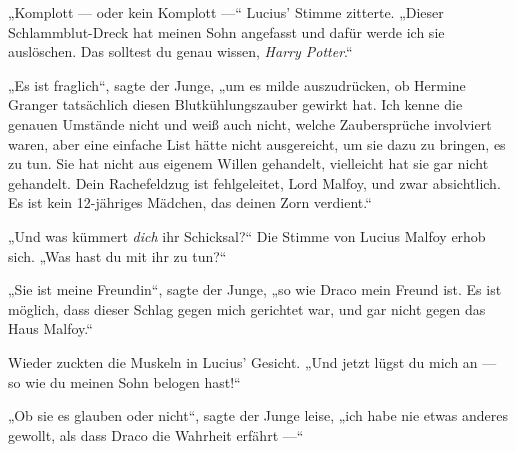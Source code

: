 „Komplott — oder kein Komplott —“ Lucius’ Stimme zitterte.
„Dieser Schlammblut-Dreck hat meinen Sohn angefasst und dafür werde ich sie auslöschen. Das solltest du genau wissen, \emph{Harry Potter}.“

„Es ist fraglich“, sagte der Junge, „um es milde auszudrücken, ob Hermine Granger tatsächlich diesen Blutkühlungszauber gewirkt hat. Ich kenne die genauen Umstände nicht und weiß auch nicht, welche Zaubersprüche involviert waren, aber eine einfache List hätte nicht ausgereicht, um sie dazu zu bringen, es zu tun. Sie hat nicht aus eigenem Willen gehandelt, vielleicht hat sie gar nicht gehandelt. Dein Rachefeldzug ist fehlgeleitet, Lord Malfoy, und zwar absichtlich. Es ist kein 12-jähriges Mädchen, das deinen Zorn verdient.“

„Und was kümmert \emph{dich} ihr Schicksal?“ Die Stimme von Lucius Malfoy erhob sich.
„Was hast du mit ihr zu tun?“

„Sie ist meine Freundin“, sagte der Junge, „so wie Draco mein Freund ist. Es ist möglich, dass dieser Schlag gegen mich gerichtet war, und gar nicht gegen das Haus Malfoy.“

Wieder zuckten die Muskeln in Lucius’ Gesicht.
„Und jetzt lügst du mich an — so wie du meinen Sohn belogen hast!“

„Ob sie es glauben oder nicht“, sagte der Junge leise, „ich habe nie etwas anderes gewollt, als dass Draco die Wahrheit erfährt —“

